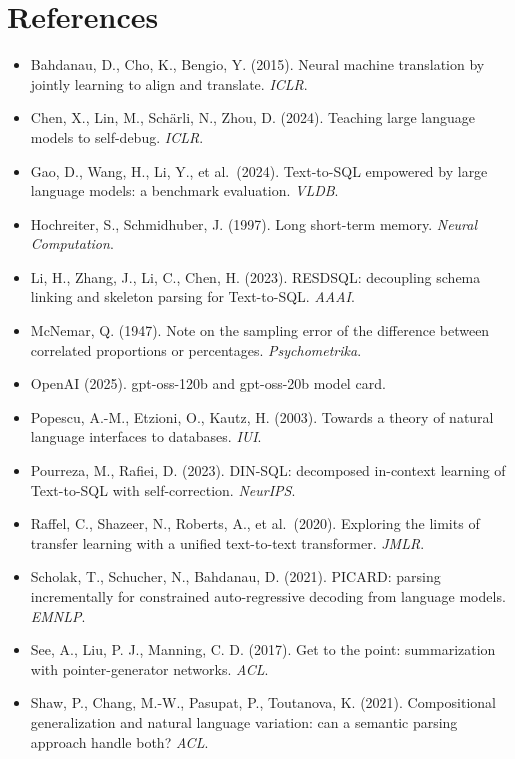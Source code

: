 \documentclass[
  10pt,
]{article}
\providecommand{\tightlist}{%
  \setlength{\itemsep}{0pt}\setlength{\parskip}{0pt}}
\begin{document}
\section*{References}\label{references}

\begin{itemize}
\tightlist
\item
  Bahdanau, D., Cho, K., Bengio, Y. (2015). Neural machine translation
  by jointly learning to align and translate. \emph{ICLR}.
\item
  Chen, X., Lin, M., Schärli, N., Zhou, D. (2024). Teaching large
  language models to self-debug. \emph{ICLR}.
\item
  Gao, D., Wang, H., Li, Y., et al.~(2024). Text-to-SQL empowered by
  large language models: a benchmark evaluation. \emph{VLDB}.
\item
  Hochreiter, S., Schmidhuber, J. (1997). Long short-term memory.
  \emph{Neural Computation}.
\item
  Li, H., Zhang, J., Li, C., Chen, H. (2023). RESDSQL: decoupling schema
  linking and skeleton parsing for Text-to-SQL. \emph{AAAI}.
\item
  McNemar, Q. (1947). Note on the sampling error of the difference
  between correlated proportions or percentages. \emph{Psychometrika}.
\item
  OpenAI (2025). gpt-oss-120b and gpt-oss-20b model card.
\item
  Popescu, A.-M., Etzioni, O., Kautz, H. (2003). Towards a theory of
  natural language interfaces to databases. \emph{IUI}.
\item
  Pourreza, M., Rafiei, D. (2023). DIN-SQL: decomposed in-context
  learning of Text-to-SQL with self-correction. \emph{NeurIPS}.
\item
  Raffel, C., Shazeer, N., Roberts, A., et al.~(2020). Exploring the
  limits of transfer learning with a unified text-to-text transformer.
  \emph{JMLR}.
\item
  Scholak, T., Schucher, N., Bahdanau, D. (2021). PICARD: parsing
  incrementally for constrained auto-regressive decoding from language
  models. \emph{EMNLP}.
\item
  See, A., Liu, P. J., Manning, C. D. (2017). Get to the point:
  summarization with pointer-generator networks. \emph{ACL}.
\item
  Shaw, P., Chang, M.-W., Pasupat, P., Toutanova, K. (2021).
  Compositional generalization and natural language variation: can a
  semantic parsing approach handle both? \emph{ACL}.

\end{itemize}
\end{document}
